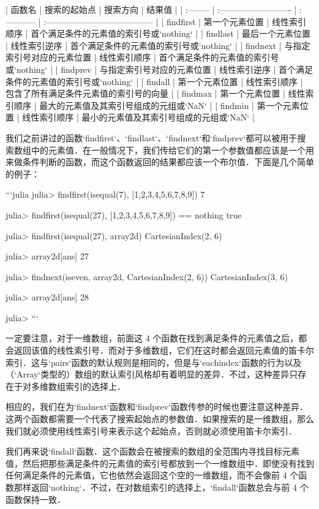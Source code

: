 | 函数名    | 搜索的起始点               | 搜索方向     | 结果值                                  |
| :-------- | :------------------------- | :----------- | :-------------------------------------- |
| findfirst | 第一个元素位置             | 线性索引顺序 | 首个满足条件的元素值的索引号或`nothing` |
| findlast  | 最后一个元素位置           | 线性索引逆序 | 首个满足条件的元素值的索引号或`nothing` |
| findnext  | 与指定索引号对应的元素位置 | 线性索引顺序 | 首个满足条件的元素值的索引号或`nothing` |
| findprev  | 与指定索引号对应的元素位置 | 线性索引逆序 | 首个满足条件的元素值的索引号或`nothing` |
| findall   | 第一个元素位置             | 线性索引顺序 | 包含了所有满足条件元素值的索引号的向量  |
| findmax   | 第一个元素位置             | 线性索引顺序 | 最大的元素值及其索引号组成的元组或`NaN` |
| findmin   | 第一个元素位置             | 线性索引顺序 | 最小的元素值及其索引号组成的元组或`NaN` |

我们之前讲过的函数`findfirst`、`findlast`、`findnext`和`findprev`都可以被用于搜索数组中的元素值．在一般情况下，我们传给它们的第一个参数值都应该是一个用来做条件判断的函数，而这个函数返回的结果都应该一个布尔值．下面是几个简单的例子：

```julia
julia> findfirst(isequal(7), [1,2,3,4,5,6,7,8,9])
7

julia> findfirst(isequal(27), [1,2,3,4,5,6,7,8,9]) == nothing
true

julia> findfirst(isequal(27), array2d)
CartesianIndex(2, 6)

julia> array2d[ans]
27

julia> findnext(iseven, array2d, CartesianIndex(2, 6))
CartesianIndex(3, 6)

julia> array2d[ans]
28

julia> 
```

一定要注意，对于一维数组，前面这 4 个函数在找到满足条件的元素值之后，都会返回该值的线性索引号．而对于多维数组，它们在这时都会返回元素值的笛卡尔索引．这与`pairs`函数的默认规则是相同的，但是与`eachindex`函数的行为以及（`Array`类型的）数组的默认索引风格却有着明显的差异．不过，这种差异只存在于对多维数组索引的选择上．

相应的，我们在为`findnext`函数和`findprev`函数传参的时候也要注意这种差异．这两个函数都需要一个代表了搜索起始点的参数值．如果搜索的是一维数组，那么我们就必须使用线性索引号来表示这个起始点，否则就必须使用笛卡尔索引．

我们再来说`findall`函数．这个函数会在被搜索的数组的全范围内寻找目标元素值，然后把那些满足条件的元素值的索引号都放到一个一维数组中．即使没有找到任何满足条件的元素值，它也依然会返回这个空的一维数组，而不会像前 4 个函数那样返回`nothing`．不过，在对数组索引的选择上，`findall`函数总会与前 4 个函数保持一致．

